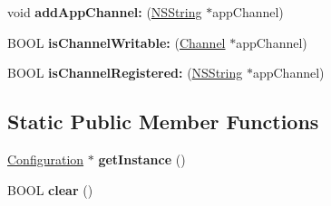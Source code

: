 \begin{DoxyCompactItemize}
\item 
\hypertarget{interface_configuration_a25bf46b6993ec0f082b7825fb5687095}{
void {\bfseries add\-App\-Channel\-:} (\hyperlink{class_n_s_string}{\-N\-S\-String} $\ast$app\-Channel)}
\label{interface_configuration_a25bf46b6993ec0f082b7825fb5687095}

\item 
\hypertarget{interface_configuration_a542a733714b57631b04eae33aef00e4c}{
\-B\-O\-O\-L {\bfseries is\-Channel\-Writable\-:} (\hyperlink{interface_channel}{\-Channel} $\ast$app\-Channel)}
\label{interface_configuration_a542a733714b57631b04eae33aef00e4c}

\item 
\hypertarget{interface_configuration_ac618686ff2d1745b70a8ae44046a04ee}{
\-B\-O\-O\-L {\bfseries is\-Channel\-Registered\-:} (\hyperlink{class_n_s_string}{\-N\-S\-String} $\ast$app\-Channel)}
\label{interface_configuration_ac618686ff2d1745b70a8ae44046a04ee}

\end{DoxyCompactItemize}
\subsection*{\-Static \-Public \-Member \-Functions}
\begin{DoxyCompactItemize}
\item 
\hypertarget{interface_configuration_ae327d26e81014cf46b25802478fe9b8e}{
\hyperlink{interface_configuration}{\-Configuration} $\ast$ {\bfseries get\-Instance} ()}
\label{interface_configuration_ae327d26e81014cf46b25802478fe9b8e}

\item 
\hypertarget{interface_configuration_a2870ffed6b7b5ec09c37a9d1701ed9f2}{
\-B\-O\-O\-L {\bfseries clear} ()}
\label{interface_configuration_a2870ffed6b7b5ec09c37a9d1701ed9f2}

\end{DoxyCompactItemize}
